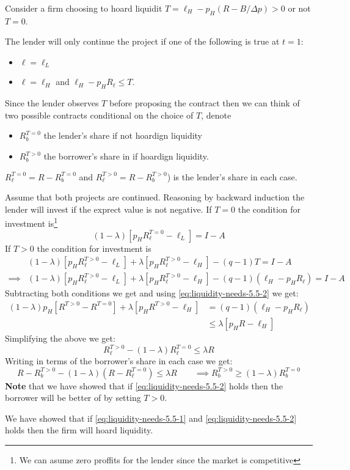 \documentclass[12pt]{article}
\begin{document}
\begin{answer}
Consider a firm choosing to hoard liquidit $T = \ell_H - p_H(R - B/\Delta p)>0$ or not $T = 0$. 

The lender will only continue the project if one of the following is true at $t=1$:

\begin{itemize}
    \item  $\ell = \ell_L$ 
    \item  $\ell = \ell_H$ and $\ell_H - p_H R_\ell \leq T$.
\end{itemize}

Since the lender observes $T$ before proposing the contract then we can think of two possible contracts conditional on the choice of $T$, denote

\begin{itemize}
    \item $R_b^{T=0}$ the lender's share if not hoardign liquidity
    \item $R_b^{T>0}$ the borrower's share in if hoardign liquidity.
\end{itemize}

$R_\ell^{T=0}=R - R_b^{T=0}$ and $R_\ell^{T>0}= R -R_b^{T>0} $) is the lender's share in each case.



Assume that both projects are continued.
Reasoning by backward induction the lender will invest if the exprect value is not negative. 
If $T=0$ the condition for investment is\footnote{We can asume zero proffits for the lender since the market is competitive} 
$$(1-\lambda)[p_H R_\ell^{T=0} - \ell_L] = I-A$$
If $T>0$ the condition for investment is 
\begin{align*}
    &(1-\lambda)[p_H R_\ell^{T>0} - \ell_L] + \lambda[p_H R_\ell^{T>0} - \ell_H] - (q-1)T = I-A\\
    \implies  &(1-\lambda)[p_H R_\ell^{T>0} - \ell_L] + \lambda[p_H R_\ell^{T>0} - \ell_H] - (q-1) (\ell_H - p_H R_\ell) = I-A
\end{align*}
Subtracting both conditions we get and using \eqref{eq:liquidity-needs-5.5-2} we get:
\begin{align*}
    (1-\lambda)p_H[R^{T>0} - R^{T=0}] + \lambda[p_H R^{T>0}-\ell_H] &=  (q-1) (\ell_H - p_H R_\ell)\\
    &\leq \lambda[p_H R - \ell_H]
\end{align*}
Simplifying the above we get:
\[R_\ell^{T>0}-(1-\lambda)R_\ell^{T=0} \leq \lambda R \]
Writing in terms of the borrower's share in each case we get:
\[
    R - R_b^{T>0}-(1-\lambda)(R - R_\ell^{T=0}) \leq \lambda R \qquad \implies R_b^{T>0} \geq (1 - \lambda) R_b^{T=0}
\]
\textbf{Note} that we have showed that if \eqref{eq:liquidity-needs-5.5-2} holds then the borrower will be better of by setting $T > 0 $.

We have showed that if \eqref{eq:liquidity-needs-5.5-1} and \eqref{eq:liquidity-needs-5.5-2} holds then the firm will hoard liquidity.

\end{answer}
\end{document}
